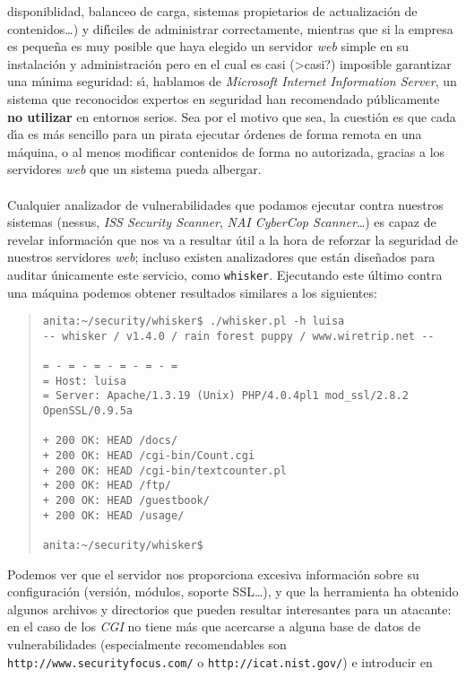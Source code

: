 disponiblidad, balanceo de carga, sistemas propietarios de actualizaci\'on de
contenidos\ldots) y dif\'{\i}ciles de administrar correctamente, mientras que
si la empresa es peque\~na es muy posible que haya elegido un servidor {\it 
web} simple en su instalaci\'on y administraci\'on pero en el cual es casi 
(>casi?) imposible garantizar una m\'{\i}nima seguridad: s\'{\i}, hablamos de 
{\it Microsoft Internet Information Server}, un sistema que reconocidos expertos
en seguridad han recomendado p\'ublicamente {\bf no utilizar} en entornos 
serios. Sea por el motivo que sea, la cuesti\'on es que cada d\'{\i}a es m\'as 
sencillo para un pirata ejecutar \'ordenes de forma remota en una m\'aquina, o 
al menos modificar contenidos de forma no autorizada, gracias a los servidores 
{\it web} que un sistema pueda albergar.\\
\\Cualquier analizador de vulnerabilidades que podamos ejecutar contra nuestros
sistemas ({\sc nessus}, {\it ISS Security Scanner}, {\it NAI CyberCop 
Scanner}\ldots) es capaz de revelar informaci\'on que nos va a resultar \'util
a la hora de reforzar la seguridad de nuestros servidores {\it web}; incluso
existen analizadores que est\'an dise\~nados para auditar \'unicamente este
servicio, como {\tt whisker}. Ejecutando este \'ultimo contra una m\'aquina
podemos obtener resultados similares a los siguientes:
\begin{quote}
\begin{verbatim}
anita:~/security/whisker$ ./whisker.pl -h luisa
-- whisker / v1.4.0 / rain forest puppy / www.wiretrip.net --

= - = - = - = - = - =
= Host: luisa
= Server: Apache/1.3.19 (Unix) PHP/4.0.4pl1 mod_ssl/2.8.2 OpenSSL/0.9.5a

+ 200 OK: HEAD /docs/
+ 200 OK: HEAD /cgi-bin/Count.cgi
+ 200 OK: HEAD /cgi-bin/textcounter.pl
+ 200 OK: HEAD /ftp/
+ 200 OK: HEAD /guestbook/
+ 200 OK: HEAD /usage/

anita:~/security/whisker$ 
\end{verbatim}
\end{quote}
Podemos ver que el servidor nos proporciona excesiva informaci\'on sobre su
configuraci\'on (versi\'on, m\'odulos, soporte SSL\ldots), y que la herramienta
ha obtenido algunos archivos y directorios que pueden resultar interesantes
para un atacante: en el caso de los {\it CGI} no tiene m\'as que acercarse a 
alguna base de datos de vulnerabilidades (especialmente recomendables son {\tt\\
http://www.securityfocus.com/} o {\tt http://icat.nist.gov/}) e introducir en
